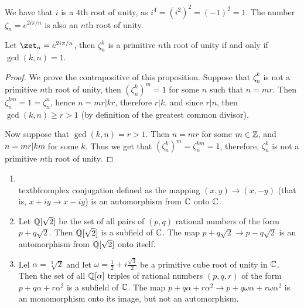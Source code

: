 \begin{example}
    We have that $i$ is a  $4$th root of unity, as  $i^4=(i^2)^2=(-1)^2=1$. The 
    number $\zeta_n=e^{2i\pi/n}$ is also an $n$th root of unity.
\end{example} 

\begin{proposition}\label{proposition1.2.2}
    Let $\zet_n=e^{2i\pi/n}$, then $\zeta_n^k$ is a primitive  $n$th root of 
    unity if and only if  $\gcd(k,n) = 1$.
\end{proposition}
\begin{proof}
    We prove the contrapositive of this proposition. Suppose that $\zeta_n^k$ is 
    not a primitive  $n$th root of unity, then  $(\zeta_n^k)^m=1$ for some  $n$ 
    such that $n=mr$. Then  $\zeta_n^{km}=1=\zeta_n ^n$, hence $n=mr|kr$, 
    therefore  $r|k$, and since  $r|n$, then  $\gcd(k,n) \geq r>1$  (by definition 
    of the greatest common divisor).

    Now suppose that  $\gcd(k,n)=r>1$. Then  $n=mr$ for some  $m \in \mathbb{Z}$, and  
    $n=mr|km$ for some  $k$. Thus we get that  $(\zeta_n^k)^m=\zeta_n^{km}=1$, 
    therefore,  $\zeta_n^k$ is not a primitive  $n$th root of unity.
\end{proof}

\begin{example}
    \begin{enumerate}[label=(\arabic*)]
        \item \\textbf{complex conjugation} defined as the mapping $(x,y) 
            \rightarrow (x,-y)$ (that is, $x+iy \rightarrow x-iy$) is an automorphism 
            from $\mathbb{C}$ onto  $\mathbb{C}$.
        \item Let  $\mathbb{Q}[\sqrt{2}]$ be the set of all pairs of $(p,q)$ rational 
            numbers of the form $p+q\sqrt{2}$. Then  $\mathbb{Q}[\sqrt{2}]$ is a subfield 
            of  $\mathbb{C}$. The map  $p+q\sqrt{2} \rightarrow p-q\sqrt{2}$ is an 
            automorphism from  $\mathbb{Q}[\sqrt{2}]$ onto itself.

        \item Lel  $\alpha=\sqrt[3]{2}$ and let  $\omega=\frac{1}{2}+
            i\frac{\sqrt{3}}{2}$ be a primitive cube root of unity in $\mathbb{C}$. Then 
            the set of all $\mathbb{Q}[\alpha]$ triples of rational numbers  $(p,q,r)$ of 
            the form $p+q\alpha+r\alpha^2$ is a subfield of  $\mathbb{C}$. The map 
            $p+q\alpha+r\alpha^2 \rightarrow p+q\omega\alpha+r\omega\alpha^2$ is an monomorphism onto its image, 
            but not an automorphism.
    \end{enumerate}		
\end{example} 
